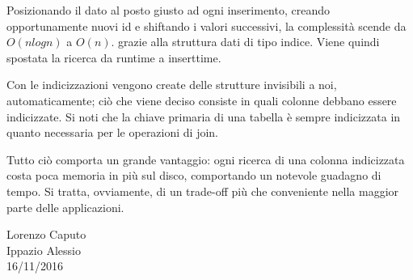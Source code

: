 Posizionando il dato al posto giusto ad ogni inserimento, creando opportunamente nuovi id e shiftando i valori successivi, la complessità scende da $O(nlogn)$ a $O(n)$.
grazie alla struttura dati di tipo indice. Viene quindi spostata la ricerca da runtime a inserttime.

Con le indicizzazioni vengono create delle strutture invisibili a noi, automaticamente; ciò che viene deciso consiste in quali colonne debbano essere indicizzate. Si noti che la chiave primaria di una tabella è sempre indicizzata in quanto necessaria per le operazioni di join.

Tutto ciò comporta un grande vantaggio: ogni ricerca di una colonna indicizzata costa poca memoria in più sul disco, comportando un notevole guadagno di tempo. Si tratta, ovviamente, di un trade-off più che conveniente nella maggior parte delle applicazioni. 



\begin{flushright}Lorenzo Caputo\\Ippazio Alessio\\16/11/2016\end{flushright}


